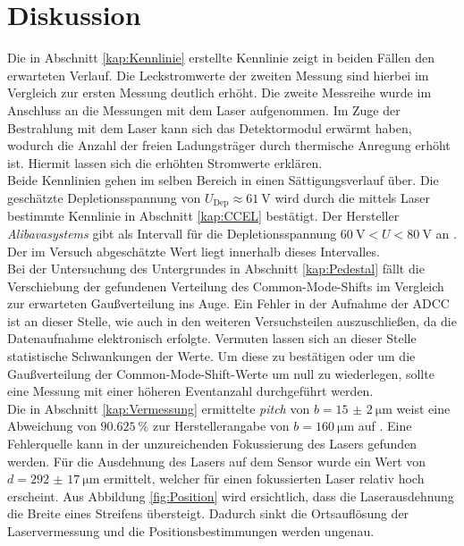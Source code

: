 \section{Diskussion}

Die in Abschnitt \ref{kap:Kennlinie} erstellte Kennlinie zeigt in beiden Fällen den erwarteten Verlauf. Die Leckstromwerte der zweiten Messung sind hierbei im Vergleich zur ersten Messung deutlich erhöht. Die zweite Messreihe wurde im Anschluss an die Messungen mit dem Laser aufgenommen. Im Zuge der Bestrahlung mit dem Laser kann sich das Detektormodul erwärmt haben, wodurch die Anzahl der freien Ladungsträger durch thermische Anregung erhöht ist. Hiermit lassen sich die erhöhten Stromwerte erklären.\\

Beide Kennlinien gehen im selben Bereich in einen Sättigungsverlauf über. Die geschätzte Depletionsspannung von $ U_{\mathrm{Dep}} \approx \SI{61}{\volt}$ wird durch die mittels Laser bestimmte Kennlinie in Abschnitt \ref{kap:CCEL} bestätigt. Der Hersteller \textit{Alibavasystems} gibt als Intervall für die Depletionsspannung $\SI{60}{\volt} < U < \SI{80}{\volt}$ an \cite{alibava}. Der im Versuch abgeschätzte Wert liegt innerhalb dieses Intervalles.\\

Bei der Untersuchung des Untergrundes in Abschnitt \ref{kap:Pedestal} fällt die Verschiebung der gefundenen Verteilung des Common-Mode-Shifts im Vergleich zur erwarteten Gaußverteilung ins Auge. Ein Fehler in der Aufnahme der ADCC ist an dieser Stelle, wie auch in den weiteren Versuchsteilen auszuschließen, da die Datenaufnahme elektronisch erfolgte.
Vermuten lassen sich an dieser Stelle statistische Schwankungen der Werte. Um diese zu bestätigen oder um die Gaußverteilung der Common-Mode-Shift-Werte um null zu wiederlegen, sollte eine Messung mit einer höheren Eventanzahl durchgeführt werden.\\

Die in Abschnitt \ref{kap:Vermessung} ermittelte \textit{pitch} von $b = \SI{15(2)}{\micro\metre}$ weist eine Abweichung von $\SI{90.625}{\%}$ zur Herstellerangabe von $b = \SI{160}{\micro\metre}$ auf \cite{alibava}. Eine Fehlerquelle kann in der unzureichenden Fokussierung des Lasers gefunden werden. Für die Ausdehnung des Lasers auf dem Sensor wurde ein Wert von $d = \SI{292(17)}{\micro\metre}$ ermittelt, welcher für einen fokussierten Laser relativ hoch erscheint. Aus Abbildung \ref{fig:Position} wird ersichtlich, dass die Laserausdehnung die Breite eines Streifens übersteigt. Dadurch sinkt die Ortsauflösung der Laservermessung und die Positionsbestimmungen werden ungenau.\\

